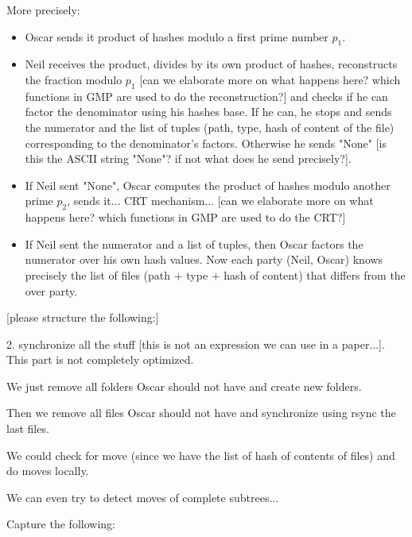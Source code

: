 \documentclass[11pt]{llncs}
\begin{document}
More precisely:
\begin{itemize}
\item Oscar sends it product of hashes modulo a first prime number $p_1$.
\item Neil receives the product, divides by its own product of hashes, reconstructs the fraction modulo $p_1$ [can we elaborate more on what happens here? which functions in GMP are used to do the reconstruction?] and checks if he can factor the denominator using his hashes base. If he can, he stops and sends the numerator and the list of tuples (path, type, hash of content of the file) corresponding to the denominator's factors. Otherwise he sends "None" [is this the ASCII string "None"? if not what does he send precisely?].
\item If Neil sent "None", Oscar computes the product of hashes modulo another prime $p_2$, sends it... CRT mechanism... [can we elaborate more on what happens here? which functions in GMP are used to do the CRT?]
\item If Neil sent the numerator and a list of tuples, then Oscar factors the numerator over his own hash values. Now each party (Neil, Oscar) knows precisely the list of files (path + type + hash of content) that differs from the over party.
\end{itemize}

[please structure the following:]\smallskip

2. synchronize all the stuff [this is not an expression we can use in a paper...]. This part is not completely optimized.\smallskip

We just remove all folders Oscar should not have and create new folders.\smallskip

Then we remove all files Oscar should not have and synchronize using rsync the last files.\smallskip

We could check for move (since we have the list of hash of contents of files) and do moves locally.\smallskip

We can even try to detect moves of complete subtrees...\smallskip


Capture the following: \smallskip
\end{document}
